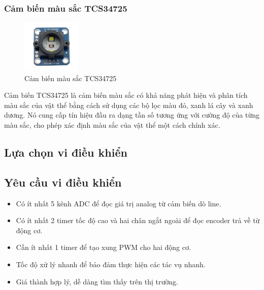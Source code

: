         \subsubsection{Cảm biến màu sắc TCS34725}
            \begin{figure}[H]
                \centering
                \includegraphics[width=0.25\textwidth]{pictures/chapter2/chapter2_pic_10.png}
                \caption{Cảm biến màu sắc TCS34725}
                \label{fig:tcs3200}
            \end{figure}
            \hspace*{0.6cm}Cảm biến TCS34725 là cảm biến màu sắc có khả năng phát hiện và phân tích màu sắc của vật thể bằng cách sử dụng các bộ lọc màu đỏ, xanh lá cây và xanh dương. Nó cung cấp tín hiệu đầu ra dạng tần số tương ứng với cường độ của từng màu sắc, cho phép xác định màu sắc của vật thể một cách chính xác.
        \subsection{Lựa chọn vi điều khiển}
            \subsection{Yêu cầu vi điều khiển}
                \begin{itemize}
                    \item Có ít nhất 5 kênh ADC để đọc giá trị analog từ cảm biến dò line. 
                    \item Có ít nhất 2 timer tốc độ cao và hai chân ngắt ngoài để đọc encoder trả về từ động cơ. 
                    \item Cần ít nhất 1 timer để tạo xung PWM cho hai động cơ. 
                    \item Tốc độ xử lý nhanh để bảo đảm thực hiện các tác vụ nhanh.
                    \item Giá thành hợp lý, dễ dàng tìm thấy trên thị trường. 
                \end{itemize}
